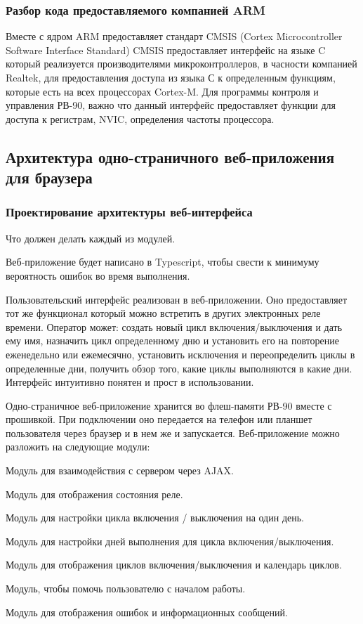 \subsubsection{ Разбор кода предоставляемого компанией ARM}
Вместе с ядром ARM предоставляет стандарт CMSIS  (Cortex Microcontroller Software Interface Standard)
CMSIS предоставляет интерфейс на языке C который реализуется производителями микроконтроллеров, в часности компанией Realtek, для предоставления доступа из языка С к определенным функциям, которые есть на всех процессорах Cortex-M. Для программы контроля и управления РВ-90, важно что данный интерфейс предоставляет функции для доступа к регистрам, NVIC, определения частоты процессора. 




\newpage
\subsection{Архитектура одно-страничного веб-приложения для браузера}


\subsubsection{ Проектирование архитектуры веб-интерфейса}
Что должен делать каждый из модулей.

Веб-приложение будет написано в Typescript, чтобы свести к минимуму вероятность ошибок во время выполнения.

Пользовательский интерфейс реализован в веб-приложении. Оно предоставляет тот же функционал который можно встретить в других электронных реле времени. Оператор может: создать новый цикл включения/выключения и дать ему имя, назначить цикл определенному дню и установить его на повторение еженедельно или ежемесячно, установить исключения и переопределить циклы в определенные дни, получить обзор того, какие циклы выполняются в какие дни. Интерфейс интуитивно понятен и прост в использовании.

Одно-страничное веб-приложение хранится во флеш-памяти РВ-90 вместе с прошивкой. При подключении оно передается на телефон или планшет пользователя через браузер и в нем же и запускается. Веб-приложение можно разложить на следующие модули:

\begin{my_itemize}
\item Модуль для взаимодействия с сервером через AJAX.
\item Модуль для отображения состояния реле.
\item Модуль для настройки цикла включения / выключения на один день.
\item Модуль для настройки дней выполнения для цикла включения/выключения.
\item Модуль для отображения циклов включения/выключения и календарь циклов.
\item Модуль, чтобы помочь пользователю с началом работы.
\item Модуль для отображения ошибок и информационных сообщений.
\end{my_itemize}

